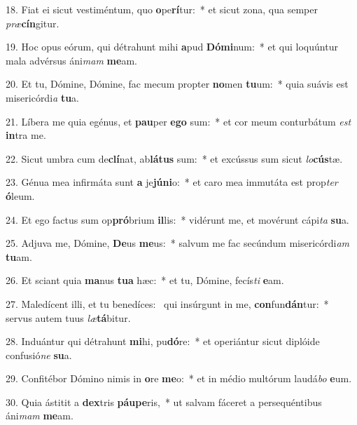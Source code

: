 18. Fiat ei sicut vestiméntum, quo \textbf{o}pe\textbf{rí}tur:~*  et sicut zona, qua semper \textit{præ}\textbf{cín}gitur.\

19. Hoc opus eórum, qui détrahunt mihi \textbf{a}pud \textbf{Dó}\textbf{mi}num:~*  et qui loquúntur mala advérsus áni\textit{mam} \textbf{me}am.\

20. Et tu, Dómine, Dómine, fac mecum propter \textbf{no}men \textbf{tu}um:~*  quia suávis est misericórdi\textit{a} \textbf{tu}a.\

21. Líbera me quia egénus, et \textbf{pau}per \textbf{e}\textbf{go} sum:~*  et cor meum conturbátum \textit{est} \textbf{in}tra me.\

22. Sicut umbra cum de\textbf{clí}nat, ab\textbf{lá}\textbf{tus} sum:~*  et excússus sum sicut \textit{lo}\textbf{cús}tæ.\

23. Génua mea infirmáta sunt \textbf{a} je\textbf{jú}\textbf{ni}o:~*  et caro mea immutáta est prop\textit{ter} \textbf{ó}leum.\

24. Et ego factus sum op\textbf{pró}brium \textbf{il}lis:~*  vidérunt me, et movérunt cápi\textit{ta} \textbf{su}a.\

25. Adjuva me, Dómine, \textbf{De}us \textbf{me}us:~*  salvum me fac secúndum misericórdi\textit{am} \textbf{tu}am.\

26. Et sciant quia \textbf{ma}nus \textbf{tu}\textbf{a} hæc:~*  et tu, Dómine, fecís\textit{ti} \textbf{e}am.\

27. Maledícent illi, et tu benedíces: \dag\  qui insúrgunt in me, \textbf{con}fun\textbf{dán}tur:~*  servus autem tuus \textit{læ}\textbf{tá}bitur.\

28. Induántur qui détrahunt \textbf{mi}hi, pu\textbf{dó}re:~*  et operiántur sicut diplóide confusió\textit{ne} \textbf{su}a.\

29. Confitébor Dómino nimis in \textbf{o}re \textbf{me}o:~*  et in médio multórum laudá\textit{bo} \textbf{e}um.\

30. Quia ástitit a \textbf{dex}tris \textbf{páu}\textbf{pe}ris,~*  ut salvam fáceret a persequéntibus áni\textit{mam} \textbf{me}am.\

